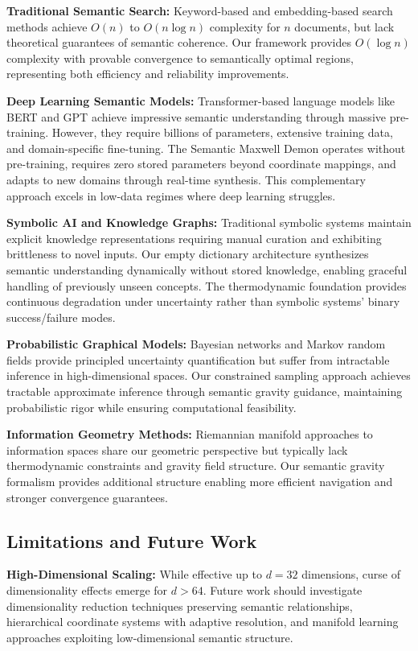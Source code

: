 \documentclass[12pt,a4paper]{article}
\begin{document}
\textbf{Traditional Semantic Search:} Keyword-based and embedding-based search methods achieve $O(n)$ to $O(n \log n)$ complexity for $n$ documents, but lack theoretical guarantees of semantic coherence. Our framework provides $O(\log n)$ complexity with provable convergence to semantically optimal regions, representing both efficiency and reliability improvements.

\textbf{Deep Learning Semantic Models:} Transformer-based language models like BERT and GPT achieve impressive semantic understanding through massive pre-training. However, they require billions of parameters, extensive training data, and domain-specific fine-tuning. The Semantic Maxwell Demon operates without pre-training, requires zero stored parameters beyond coordinate mappings, and adapts to new domains through real-time synthesis. This complementary approach excels in low-data regimes where deep learning struggles.

\textbf{Symbolic AI and Knowledge Graphs:} Traditional symbolic systems maintain explicit knowledge representations requiring manual curation and exhibiting brittleness to novel inputs. Our empty dictionary architecture synthesizes semantic understanding dynamically without stored knowledge, enabling graceful handling of previously unseen concepts. The thermodynamic foundation provides continuous degradation under uncertainty rather than symbolic systems' binary success/failure modes.

\textbf{Probabilistic Graphical Models:} Bayesian networks and Markov random fields provide principled uncertainty quantification but suffer from intractable inference in high-dimensional spaces. Our constrained sampling approach achieves tractable approximate inference through semantic gravity guidance, maintaining probabilistic rigor while ensuring computational feasibility.

\textbf{Information Geometry Methods:} Riemannian manifold approaches to information spaces share our geometric perspective but typically lack thermodynamic constraints and gravity field structure. Our semantic gravity formalism provides additional structure enabling more efficient navigation and stronger convergence guarantees.

\subsection{Limitations and Future Work}

\textbf{High-Dimensional Scaling:} While effective up to $d = 32$ dimensions, curse of dimensionality effects emerge for $d > 64$. Future work should investigate dimensionality reduction techniques preserving semantic relationships, hierarchical coordinate systems with adaptive resolution, and manifold learning approaches exploiting low-dimensional semantic structure.
\end{document}
